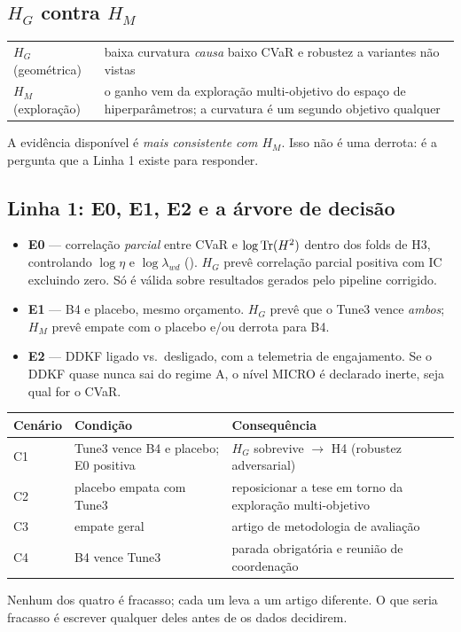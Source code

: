 \subsection{$H_G$ contra $H_M$}
\begin{center}
\begin{tabular}{@{}lp{10.5cm}@{}}
\toprule
$H_G$ (geométrica) & baixa curvatura \emph{causa} baixo CVaR e robustez a variantes não vistas \\
$H_M$ (exploração) & o ganho vem da exploração multi-objetivo do espaço de hiperparâmetros; a curvatura é um segundo objetivo qualquer \\
\bottomrule
\end{tabular}
\end{center}
A evidência disponível é \emph{mais consistente com $H_M$}. Isso não é uma derrota: é a pergunta que a Linha 1 existe para responder.

\subsection{Linha 1: E0, E1, E2 e a árvore de decisão}\label{sec:linha1}
\begin{itemize}
\item \textbf{E0} --- correlação \emph{parcial} entre CVaR e $\log\operatorname{Tr}(H^2)$ dentro dos folds de H3, controlando $\log\eta$ e $\log\lambda_{wd}$ (). $H_G$ prevê correlação parcial positiva com IC excluindo zero. Só é válida sobre resultados gerados pelo pipeline corrigido.
\item \textbf{E1} --- B4 e placebo, mesmo orçamento. $H_G$ prevê que o Tune3 vence \emph{ambos}; $H_M$ prevê empate com o placebo e/ou derrota para B4.
\item \textbf{E2} --- DDKF ligado vs.\ desligado, com a telemetria de engajamento. Se o DDKF quase nunca sai do regime A, o nível MICRO é declarado inerte, seja qual for o CVaR.
\end{itemize}
\begin{center}\small
\begin{tabular}{@{}llp{7cm}@{}}
\toprule
Cenário & Condição & Consequência \\ \midrule
C1 & Tune3 vence B4 e placebo; E0 positiva & $H_G$ sobrevive $\to$ H4 (robustez adversarial) \\
C2 & placebo empata com Tune3 & reposicionar a tese em torno da exploração multi-objetivo \\
C3 & empate geral & artigo de metodologia de avaliação \\
C4 & B4 vence Tune3 & parada obrigatória e reunião de coordenação \\
\bottomrule
\end{tabular}
\end{center}
Nenhum dos quatro é fracasso; cada um leva a um artigo diferente. O que seria fracasso é escrever qualquer deles antes de os dados decidirem.

